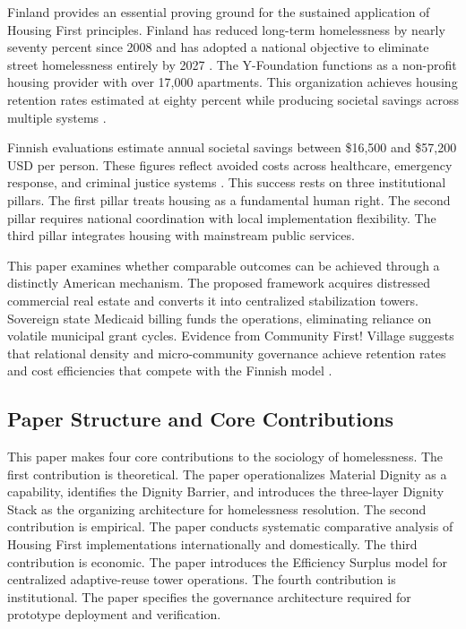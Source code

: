 \documentclass[12pt, letterpaper]{article}
\begin{document}
Finland provides an essential proving ground for the sustained application of Housing First principles. Finland has reduced long-term homelessness by nearly seventy percent since 2008 and has adopted a national objective to eliminate street homelessness entirely by 2027 \citep{sdg16plus_2023}. The Y-Foundation functions as a non-profit housing provider with over 17,000 apartments. This organization achieves housing retention rates estimated at eighty percent while producing societal savings across multiple systems \citep{the_atlas_2023}.

Finnish evaluations estimate annual societal savings between \$16,500 and \$57,200 USD per person. These figures reflect avoided costs across healthcare, emergency response, and criminal justice systems \citep{sdg16plus_2023, yfoundation_2024}. This success rests on three institutional pillars. The first pillar treats housing as a fundamental human right. The second pillar requires national coordination with local implementation flexibility. The third pillar integrates housing with mainstream public services.

This paper examines whether comparable outcomes can be achieved through a distinctly American mechanism. The proposed framework acquires distressed commercial real estate and converts it into centralized stabilization towers. Sovereign state Medicaid billing funds the operations, eliminating reliance on volatile municipal grant cycles. Evidence from Community First! Village suggests that relational density and micro-community governance achieve retention rates and cost efficiencies that compete with the Finnish model \citep{mlf_2024}.

\subsection{Paper Structure and Core Contributions}

This paper makes four core contributions to the sociology of homelessness. The first contribution is theoretical. The paper operationalizes Material Dignity as a capability, identifies the Dignity Barrier, and introduces the three-layer Dignity Stack as the organizing architecture for homelessness resolution. The second contribution is empirical. The paper conducts systematic comparative analysis of Housing First implementations internationally and domestically. The third contribution is economic. The paper introduces the Efficiency Surplus model for centralized adaptive-reuse tower operations. The fourth contribution is institutional. The paper specifies the governance architecture required for prototype deployment and verification.
\end{document}
